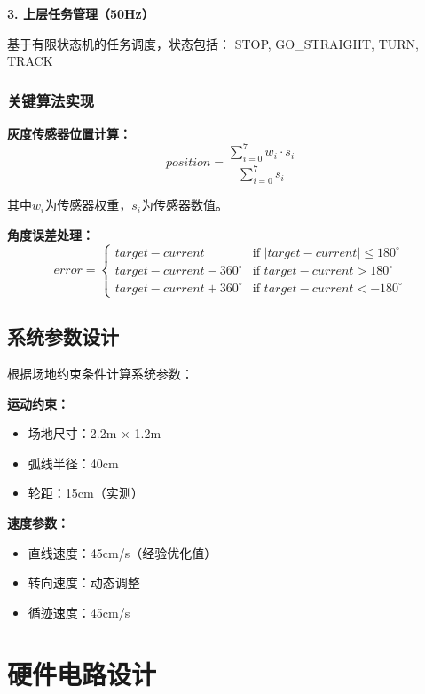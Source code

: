 \documentclass[UTF8]{ctexart}
\begin{document}
\textbf{3. 上层任务管理（50Hz）}

基于有限状态机的任务调度，状态包括：
STOP, GO\_STRAIGHT, TURN, TRACK

\subsubsection{关键算法实现}

\textbf{灰度传感器位置计算：}
\begin{equation}
position = \frac{\sum_{i=0}^{7} w_i \cdot s_i}{\sum_{i=0}^{7} s_i}
\end{equation}

其中$w_i$为传感器权重，$s_i$为传感器数值。

\textbf{角度误差处理：}
\begin{equation}
error = \begin{cases}
target - current & \text{if } |target - current| \leq 180^\circ \\
target - current - 360^\circ & \text{if } target - current > 180^\circ \\
target - current + 360^\circ & \text{if } target - current < -180^\circ
\end{cases}
\end{equation}

\subsection{系统参数设计}

根据场地约束条件计算系统参数：

\textbf{运动约束：}
\begin{itemize}
    \item 场地尺寸：2.2m × 1.2m
    \item 弧线半径：40cm
    \item 轮距：15cm（实测）
\end{itemize}

\textbf{速度参数：}
\begin{itemize}
    \item 直线速度：45cm/s（经验优化值）
    \item 转向速度：动态调整
    \item 循迹速度：45cm/s
\end{itemize}

\section{硬件电路设计}
\end{document}

